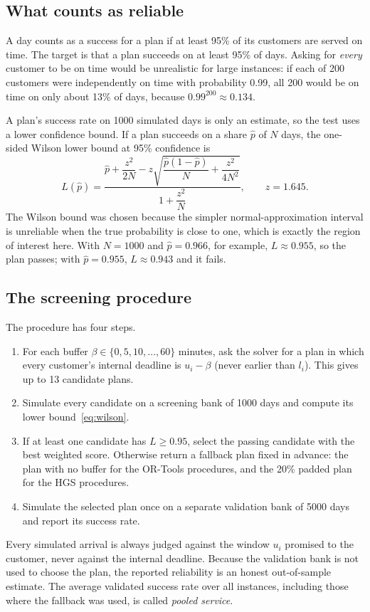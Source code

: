\documentclass[12pt,letterpaper]{article}
\begin{document}
\subsection{What counts as reliable}

A day counts as a success for a plan if at least 95\% of its customers are served
on time. The target is that a plan succeeds on at least 95\% of days. Asking for
\emph{every} customer to be on time would be unrealistic for large instances: if
each of 200 customers were independently on time with probability 0.99, all 200
would be on time on only about 13\% of days, because $0.99^{200}\approx0.134$.

A plan's success rate on 1000 simulated days is only an estimate, so the test uses
a lower confidence bound. If a plan succeeds on a share $\hat p$ of $N$ days, the
one-sided Wilson lower bound\cite{wilson1927} at 95\% confidence is
\begin{equation}
 L(\hat p)=\frac{\hat p+\dfrac{z^2}{2N}-z\sqrt{\dfrac{\hat p(1-\hat p)}{N}+\dfrac{z^2}{4N^2}}}{1+\dfrac{z^2}{N}},
 \qquad z=1.645 .
 \label{eq:wilson}
\end{equation}
The Wilson bound was chosen because the simpler normal-approximation interval is
unreliable when the true probability is close to one\cite{brown2001}, which is
exactly the region of interest here. With $N=1000$ and $\hat p=0.966$, for example,
$L\approx0.955$, so the plan passes; with $\hat p=0.955$, $L\approx0.943$ and it fails.

\subsection{The screening procedure}

The procedure has four steps.
\begin{enumerate}
\item For each buffer $\beta\in\{0,5,10,\ldots,60\}$ minutes, ask the solver for a
plan in which every customer's internal deadline is $u_i-\beta$ (never earlier than
$l_i$). This gives up to 13 candidate plans.
\item Simulate every candidate on a screening bank of 1000 days and compute its
lower bound~\eqref{eq:wilson}.
\item If at least one candidate has $L\ge0.95$, select the passing candidate with
the best weighted score. Otherwise return a fallback plan fixed in advance: the
plan with no buffer for the OR-Tools procedures, and the 20\% padded plan for the
HGS procedures.
\item Simulate the selected plan once on a separate validation bank of 5000 days
and report its success rate.
\end{enumerate}
Every simulated arrival is always judged against the window $u_i$ promised to the
customer, never against the internal deadline. Because the validation bank is not
used to choose the plan, the reported reliability is an honest out-of-sample
estimate. The average validated success rate over all instances, including those
where the fallback was used, is called \emph{pooled service}.
\end{document}
